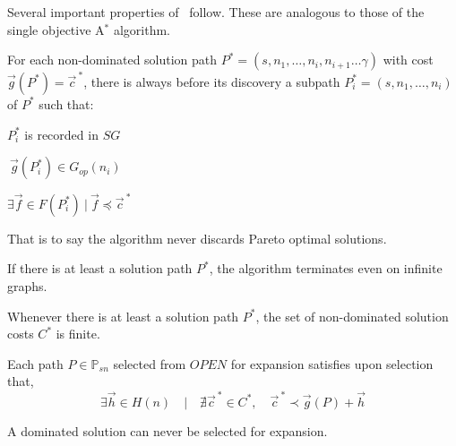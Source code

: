 Several important properties of \namoa \ follow. These are analogous to those of the single objective A$^*$ algorithm.

\begin{teorema} \label{chapFormalAnalysis:teo:multiObjAdmissibility-teorema1Namoa} \citep[Theorem 4.2]{Mandow2010}
 For each non-dominated solution path
  $P^*=(s, n_1,\ldots, n_i, n_{i+1}\ldots \gamma)$ with cost $\vec
  g(P^*) = \vec c^{~*}$, there is always before its discovery a subpath
  $P_{i}^*=(s, n_1, \ldots,n_i)$  of $P^*$ such that: 
\begin{description}
  \centering  
    \item[a)]$P_{i}^*$ is recorded in $SG$
    \item[b)]$\ \vec g(P_{i}^*) \in G_{op}(n_i)$ \ \ \ \ \ \ \
    \item[c)]$\exists  \vec f \in F(P_{i}^*) \ | \ \vec f \preceq \vec c^{~*}$
\end{description}
That is to say the algorithm never discards Pareto optimal solutions.

\end{teorema}

\begin{teorema} \label{chapFormalAnalysis:teo:multiObjAdmissibility-teorema2Namoa} 
\citep[Theorem 4.3]{Mandow2010}
If there is at least a solution path $P^*$, the algorithm terminates even on infinite graphs.
\end{teorema}

\begin{corolario} \label{chapFormalAnalysis:corol:multiObjAdmissibility-corolario1Namoa} 
\citep[Corollary 4.4]{Mandow2010}
Whenever there is at least a solution path $P^*$, the set of non-dominated solution costs $C^*$ is finite.
\end{corolario}

\begin{lema}\label{chapFormalAnalysis:lem:multiObjAdmissibility-lema1Namoa} 
\citep[Lemma 4.5]{Mandow2010}
Each path $P \in \mathbb{P}_{sn}$  selected from $OPEN$ for expansion
  satisfies upon selection that,
\begin{equation}
\exists \vec h \in H(n) \quad | \quad \nexists \vec c^{~*} \in C^*,
  \quad \vec c^{~*}\prec
  \vec g(P) + \vec h
\end{equation}
\end{lema}

\begin{teorema}\label{chapFormalAnalysis:teo:multiObjAdmissibility-teorema4Namoa} 
\citep[Theorem 4.6]{Mandow2010}
A dominated solution can never be selected for expansion.
\end{teorema}

